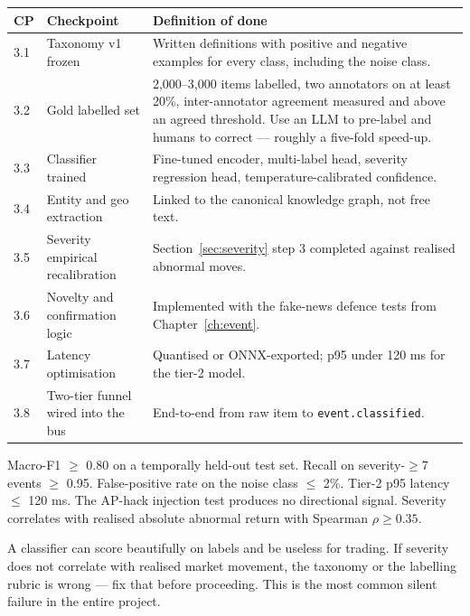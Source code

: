 \begin{longtable}{@{}p{1.4cm}p{6.0cm}p{7.0cm}@{}}
\toprule
\textbf{CP} & \textbf{Checkpoint} & \textbf{Definition of done}\\
\midrule
3.1 & Taxonomy v1 frozen & Written definitions with positive and negative
examples for every class, including the noise class.\\
3.2 & Gold labelled set & 2{,}000--3{,}000 items labelled, two annotators on at
least 20\%, inter-annotator agreement measured and above an agreed threshold.
Use an LLM to pre-label and humans to correct --- roughly a five-fold speed-up.\\
3.3 & Classifier trained & Fine-tuned encoder, multi-label head, severity
regression head, temperature-calibrated confidence.\\
3.4 & Entity and geo extraction & Linked to the canonical knowledge graph, not
free text.\\
3.5 & Severity empirical recalibration & Section~\ref{sec:severity} step 3
completed against realised abnormal moves.\\
3.6 & Novelty and confirmation logic & Implemented with the fake-news defence
tests from Chapter~\ref{ch:event}.\\
3.7 & Latency optimisation & Quantised or ONNX-exported; p95 under 120 ms for
the tier-2 model.\\
3.8 & Two-tier funnel wired into the bus & End-to-end from raw item to
\texttt{event.classified}.\\
\bottomrule
\end{longtable}

\begin{gatebox}[title={Gate G3}]
Macro-F1 $\ge$ 0.80 on a temporally held-out test set. Recall on
severity-$\ge$7 events $\ge$ 0.95. False-positive rate on the noise class
$\le$ 2\%. Tier-2 p95 latency $\le$ 120 ms. The AP-hack injection test produces
no directional signal. Severity correlates with realised absolute abnormal
return with Spearman $\rho \ge 0.35$.
\end{gatebox}

\begin{warnbox}[title={The severity correlation is the real gate}]
A classifier can score beautifully on labels and be useless for trading. If
severity does not correlate with realised market movement, the taxonomy or the
labelling rubric is wrong --- fix that before proceeding. This is the most
common silent failure in the entire project.
\end{warnbox}

